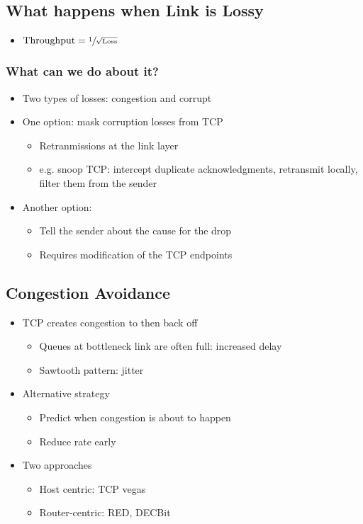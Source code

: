 \subsection{What happens when Link is Lossy}
\begin{itemize}[nosep]
    \item $\text{Throughput} = \sfrac{1}{\sqrt{\text{Loss}}}$
\end{itemize}
\subsubsection{What can we do about it?}
\begin{itemize}[nosep]
    \item Two types of losses: congestion and corrupt
    \item One option: mask corruption losses from TCP
          \begin{itemize}[nosep]
              \item Retranmissions at the link layer
              \item e.g. snoop TCP: intercept duplicate acknowledgments, retransmit locally, filter them from the sender
          \end{itemize}
    \item Another option:
          \begin{itemize}[nosep]
              \item Tell the sender about the cause for the drop
              \item Requires modification of the TCP endpoints
          \end{itemize}
\end{itemize}
\subsection{Congestion Avoidance}
\begin{itemize}[nosep]
    \item TCP creates congestion to then back off
          \begin{itemize}[nosep]
              \item Queues at bottleneck link are often full: increased delay
              \item Sawtooth pattern: jitter
          \end{itemize}
    \item Alternative strategy
          \begin{itemize}[nosep]
              \item Predict when congestion is about to happen
              \item Reduce rate early
          \end{itemize}
    \item Two approaches
          \begin{itemize}[nosep]
              \item Host centric: TCP vegas
              \item Router-centric: RED, DECBit
          \end{itemize}
\end{itemize}
